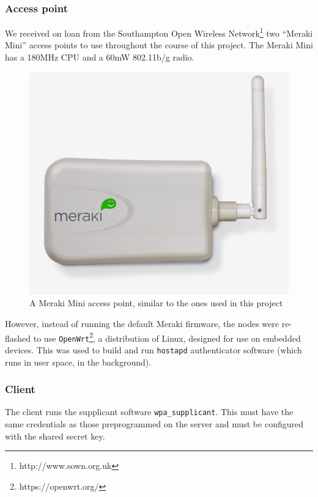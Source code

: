 \documentclass[12pt,a4paper,titlepage]{article}
\begin{document}
\subsubsection{Access point}
\label{sec:implementation;sub:components;sub:accesspoint}
We received on loan from the Southampton Open Wireless Network\footnote{http://www.sown.org.uk} two ``Meraki Mini'' access points to use throughout the course of this project. The Meraki Mini has a 180MHz CPU and a 60mW 802.11b/g radio.
\begin{figure}[h!]
\centering
\includegraphics[scale=0.3]{./images/meraki-mini.jpg}
\caption{A Meraki Mini access point, similar to the ones used in this project \cite{imagemeraki}}
\end{figure}

However, instead of running the default Meraki firmware, the nodes were re-flashed to use \texttt{OpenWrt}\footnote{https://openwrt.org/}, a distribution of Linux, designed for use on embedded devices. This was used to build and run \texttt{hostapd} authenticator software (which runs in user space, in the background).

\subsubsection{Client}
\label{sec:implementation;sub:components;sub:client}
The client runs the supplicant software \texttt{wpa\_supplicant}. This must have the same credentials as those preprogrammed on the server and must be configured with the shared secret key.
\end{document}
